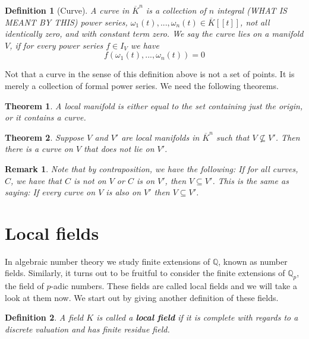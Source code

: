 \documentclass{article}
\newtheorem{theorem}{Theorem}[section]
\newtheorem{definition}{Definition}[section]
\newtheorem{remark}{Remark}[section]
\newcommand{\mbb}[1]{\mathbb{#1}}
\begin{document}
\begin{definition}[Curve]
    A curve in $\overline K^n$ is a collection of $n$ integral (WHAT IS MEANT BY THIS) power series, $\omega_1(t), ..., \omega_n(t) \in \overline K[[t]]$, not all identically zero, and with constant term zero. We say the curve lies on a manifold $V$, if for every power series $f \in I_V$ we have $$f(\omega_1(t), ..., \omega_n(t)) = 0$$
\end{definition}
Not that a curve in the sense of this definition above is not a set of points. It is merely a collection of formal power series. We need the following theorems.
\begin{theorem}\label{thm: The shape of a manifold}
    A local manifold is either equal to the set containing just the origin, or it contains a curve.
\end{theorem}

\begin{theorem}\label{thm: One manifold is contained in another}
    Suppose $V$ and $V'$ are local manifolds in $\overline K^n$ such that $V \nsubseteq V'$. Then there is a curve on $V$ that does not lie on $V'$.
\end{theorem}
\begin{remark}
    Note that by contraposition, we have the following: If for all curves, $C$, we have that $C$ is not on $V$ or $C$ is on $V'$, then $V \subseteq V'$. This is the same as saying: If every curve on $V$ is also on $V'$ then $V \subseteq V'$.
\end{remark}


\section{Local fields}
In algebraic number theory we study finite extensions of $\mbb Q$, known as number fields. Similarly, it turns out to be fruitful to consider the finite extensions of $\mbb Q_p$, the field of $p$-adic numbers. These fields are called local fields and we will take a look at them now. We start out by giving another definition of these fields.

\begin{definition}
    A field $K$ is called a \textbf{local field} if it is complete with regards to a discrete valuation and has finite residue field.
\end{definition}
\end{document}
